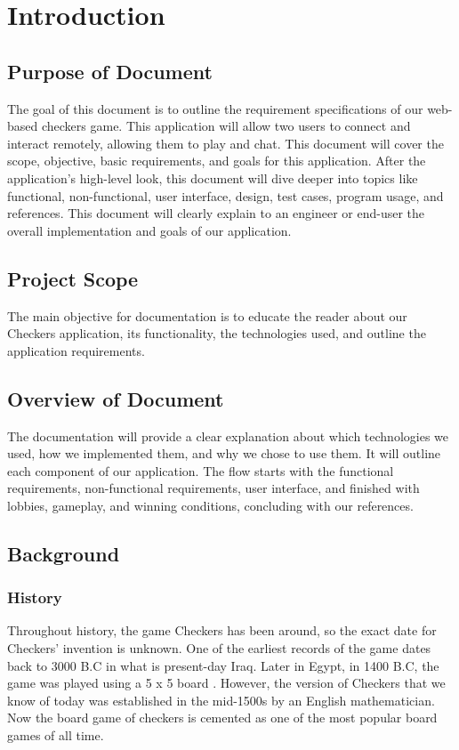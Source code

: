 \documentclass[10pt]{article}
\begin{document}
\section{Introduction}

\subsection{Purpose of Document}
The goal of this document is to outline the requirement specifications of our web-based checkers game. 
This application will allow two users to connect and interact remotely, allowing them to play and chat. 
This document will cover the scope, objective, basic requirements, and goals for this application. 
After the application's high-level look, this document will dive deeper into topics like functional, 
non-functional, user interface, design, test cases, program usage, and references. 
This document will clearly explain to an engineer or end-user the overall implementation 
and goals of our application.

\subsection{Project Scope}
The main objective for documentation is to educate the reader about our Checkers application, 
its functionality, the technologies used, and outline the application requirements.

\subsection{Overview of Document}
The documentation will provide a clear explanation about which technologies we used, 
how we implemented them, and why we chose to use them. It will outline each component 
of our application. The flow starts with the functional requirements, non-functional requirements, 
user interface, and finished with lobbies, gameplay, and winning conditions, concluding with our references. 

\subsection{Background}

\subsubsection{History}

Throughout history, the game Checkers has been around, so the exact date for Checkers' 
invention is unknown. One of the earliest records of the game dates back to 3000 B.C in what 
is present-day Iraq. Later in Egypt, in 1400 B.C, the game was played using a 5 x 5 board \cite{historyCheckers}. 
However, the version of Checkers that we know of today was established in the mid-1500s by an English mathematician. 
Now the board game of checkers is cemented as one of the most popular board games of all time. 
\end{document}
